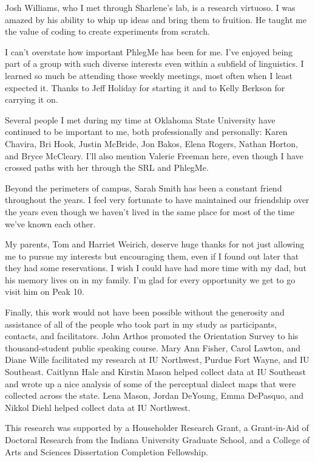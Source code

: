 \documentclass[showabstract,showacknowledgments,showdedication]{iuphd}
\begin{document}
\begin{acknowledgments}
Josh Williams, who I met through Sharlene's lab, is a research virtuoso.
I was amazed by his ability to whip up ideas and bring them to fruition.
He taught me the value of coding to create experiments from scratch.

I can't overstate how important PhlegMe has been for me.
I've enjoyed being part of a group with such diverse interests even within a subfield of linguistics. 
I learned so much be attending those weekly meetings, most often when I least expected it.
Thanks to Jeff Holiday for starting it and to Kelly Berkson for carrying it on.

Several people I met during my time at Oklahoma State University have continued to be important to me, both professionally and personally: Karen Chavira, Bri Hook, Justin McBride, Jon Bakos, Elena Rogers, Nathan Horton, and Bryce McCleary.
I'll also mention Valerie Freeman here, even though I have crossed paths with her through the SRL and PhlegMe.

Beyond the perimeters of campus, Sarah Smith has been a constant friend throughout the years.
I feel very fortunate to have maintained our friendship over the years even though we haven't lived in the same place for most of the time we've known each other. 

My parents, Tom and Harriet Weirich, deserve huge thanks for not just allowing me to pursue my interests but encouraging them, even if I found out later that they had some reservations.
I wish I could have had more time with my dad, but his memory lives on in my family.
I'm glad for every opportunity we get to go visit him on Peak 10. 

Finally, this work would not have been possible without the generosity and assistance of all of the people who took part in my study as participants, contacts, and facilitators.
John Arthos promoted the Orientation Survey to his thousand-student public speaking course.
Mary Ann Fisher, Carol Lawton, and Diane Wille facilitated my research at IU Northwest, Purdue Fort Wayne, and IU Southeast.
Caitlynn Hale and Kirstin Mason helped collect data at IU Southeast and wrote up a nice analysis of some of the perceptual dialect maps that were collected across the state.
Lena Mason, Jordan DeYoung, Emma DePasquo, and Nikkol Diehl helped collect data at IU Northwest.

This research was supported by a Householder Research Grant, a Grant-in-Aid of Doctoral Research from the Indiana University Graduate School, and a College of Arts and Sciences Dissertation Completion Fellowship.

 

\end{acknowledgments}
\end{document}

